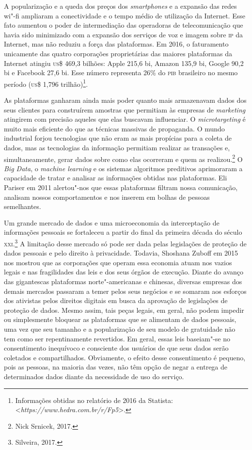 A popularização e a queda dos preços dos \emph{smartphones} e a expansão das
redes wi"-fi ampliaram a conectividade e o tempo médio de utilização da
Internet. Esse fato aumentou o poder de intermediação das operadoras de
telecomunicação que havia sido minimizado com a expansão dos serviços de
voz e imagem sobre \textsc{ip} da Internet, mas não reduziu a força das
plataformas. Em 2016, o faturamento unicamente das quatro corporações
proprietárias das maiores plataformas da Internet atingiu \textsc{us}\$ 469,3
bilhões: Apple 215,6 bi, Amazon 135,9 bi, Google 90,2 bi e Facebook 27,6
bi. Esse número representa 26\% do \textsc{pib} brasileiro no mesmo período
(\textsc{us}\$ 1,796 trilhão)\footnote{Informações obtidas no relatório de 2016
  da Statista: \textless{}\emph{https://www.hedra.com.br/r/Fp5}\textgreater{}.}.

As plataformas ganharam ainda mais poder quanto mais armazenavam dados
dos seus clientes para construírem amostras que permitiam às empresas de
\emph{marketing} atingirem com precisão aqueles que elas buscavam influenciar.
O \emph{microtargeting} é muito mais eficiente do que as técnicas massivas de
propaganda. O mundo industrial forjou tecnologias que não eram as mais
propícias para a coleta de dados, mas as tecnologias da informação
permitiam realizar as transações e, simultaneamente, gerar dados sobre
como elas ocorreram e quem as realizou.\footnote{Nick Srnicek, 2017.} O \emph{Big Data},
o \emph{machine learning} e os sistemas algoritmos preditivos aprimoraram a
capacidade de tratar e analisar as informações obtidas nas plataformas.
Eli Pariser em 2011 alertou"-nos que essas plataformas filtram nossa
comunicação, analisam nossos comportamentos e nos inserem em bolhas de
pessoas semelhantes.

Um grande mercado de dados e uma microeconomia da interceptação de
informações pessoais se fortaleceu a partir do final da primeira década
do século \textsc{xxi}.\footnote{Silveira, 2017.} A limitação desse mercado só pode ser
dada pelas legislações de proteção de dados pessoais e pelo direito à
privacidade. Todavia, Shoshana Zuboff em 2015 nos mostrou que as
corporações que operam essa economia atuam nos vazios legais e nas
fragilidades das leis e dos seus órgãos de execução. Diante do avanço
das gigantescas plataformas norte"-americanas e chinesas, diversas
empresas dos demais mercados passaram a temer pelos seus negócios e se
somaram aos esforços dos ativistas pelos direitos digitais em busca da
aprovação de legislações de proteção de dados. Mesmo assim, tais peças
legais, em geral, não podem impedir ou simplesmente bloquear as
plataformas que se alimentam de dados pessoais, uma vez que seu tamanho
e a popularização de seu modelo de gratuidade não tem como ser
repentinamente revertidos. Em geral, essas leis baseiam"-se no
consentimento inequívoco e consciente dos usuários de que seus dados
serão coletados e compartilhados. Obviamente, o efeito desse
consentimento é pequeno, pois as pessoas, na maioria das vezes, não têm
opção de negar a entrega de determinados dados diante da necessidade de
uso do serviço.

